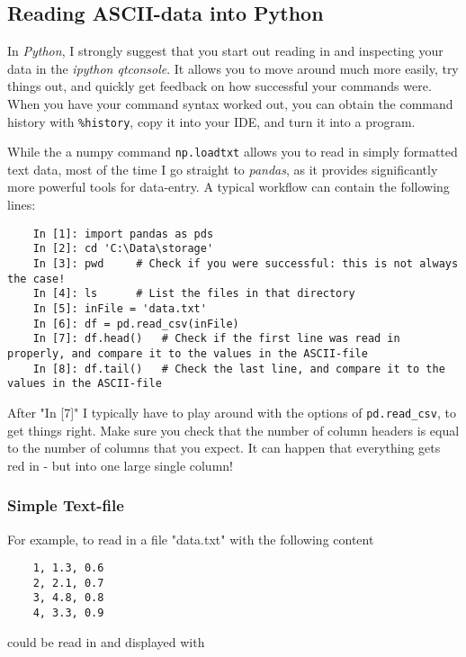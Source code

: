 \subsection{Reading ASCII-data into Python}

In \emph{Python}, I strongly suggest that you start out reading in and inspecting your data in the \emph{ipython qtconsole}. It allows you to move around much more easily, try things out, and quickly get feedback on how successful your commands were. When you have your command syntax worked out, you can obtain the command history with \lstinline{%history}, copy it into your IDE, and turn it into a program.

While the a numpy command \lstinline{np.loadtxt} allows you to read in simply formatted text data, most of the time I go straight to \emph{pandas}, as it provides significantly more powerful tools for data-entry. A typical workflow can contain the following lines:

\begin{lstlisting}
    In [1]: import pandas as pds
    In [2]: cd 'C:\Data\storage'
    In [3]: pwd     # Check if you were successful: this is not always the case!
    In [4]: ls      # List the files in that directory
    In [5]: inFile = 'data.txt'
    In [6]: df = pd.read_csv(inFile)
    In [7]: df.head()   # Check if the first line was read in properly, and compare it to the values in the ASCII-file
    In [8]: df.tail()   # Check the last line, and compare it to the values in the ASCII-file
\end{lstlisting}

After "In [7]" I typically have to play around with the options of \lstinline{pd.read_csv}, to get things right.
Make sure you check that the number of column headers is equal to the number of columns that you expect. It can happen that everything gets red in - but into one large single column!

\subsubsection{Simple Text-file}

For example, to read in a file "data.txt" with the following content

\begin{lstlisting}
    1, 1.3, 0.6
    2, 2.1, 0.7
    3, 4.8, 0.8
    4, 3.3, 0.9
\end{lstlisting}

could be read in and displayed with

